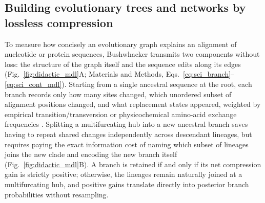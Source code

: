 \documentclass[11pt,a4paper]{article}
\begin{document}

\subsection*{Building evolutionary trees and networks by lossless compression}

To measure how concisely an evolutionary graph explains an alignment of nucleotide or protein sequences, Bushwhacker transmits two components without loss: the structure of the graph itself and the sequence edits along its edges (Fig.~\ref{fig:didactic_mdl}A; Materials and Methods, Eqs.~\ref{eq:sci_branch}--\ref{eq:sci_cont_mdl}). Starting from a single ancestral sequence at the root, each branch records only how many sites changed, which unordered subset of alignment positions changed, and what replacement states appeared, weighted by empirical transition/transversion or physicochemical amino-acid exchange frequencies \citep{dayhoff1978model}. Splitting a multifurcating hub into a new ancestral branch saves having to repeat shared changes independently across descendant lineages, but requires paying the exact information cost of naming which subset of lineages joins the new clade and encoding the new branch itself (Fig.~\ref{fig:didactic_mdl}B). A branch is retained if and only if its net compression gain is strictly positive; otherwise, the lineages remain naturally joined at a multifurcating hub, and positive gains translate directly into posterior branch probabilities without resampling.
\end{document}
